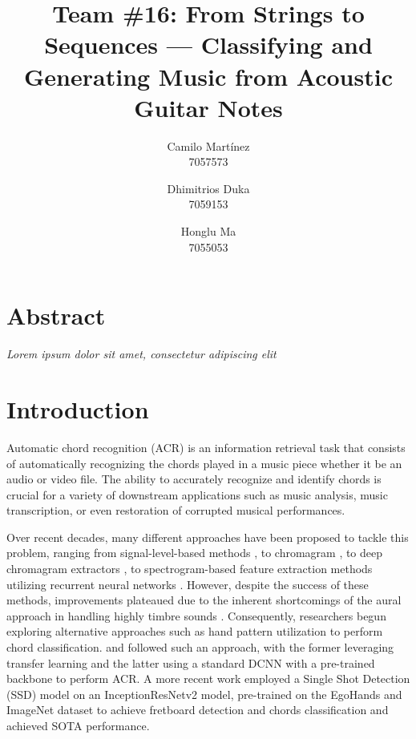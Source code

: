 \documentclass[10pt,twocolumn,letterpaper]{article}
\begin{document}
\newcommand{\dhimitrios}[1]{\textcolor{red}{Dhimitrios: #1}}

\title{Team \#16: From Strings to Sequences --- Classifying and Generating Music from Acoustic Guitar Notes}


\author{
  Camilo Martínez\\
  7057573\\
  \and
  Dhimitrios Duka\\
  7059153\\
  \and
  Honglu Ma\\
  7055053\\
}
\maketitle

\section{Abstract}
\emph{Lorem ipsum dolor sit amet, consectetur adipiscing elit}

\section{Introduction}
Automatic chord recognition (ACR) is an information retrieval task that consists of automatically recognizing the chords played in a music piece whether it be an audio or video file. The ability to accurately recognize and identify chords is crucial for a variety of downstream applications such as music analysis, music transcription, or even restoration of corrupted musical performances. 

Over recent decades, many different approaches have been proposed to tackle this problem, ranging from signal-level-based methods \cite{takuya1999realtime}, to chromagram \cite{stark2009real}, to deep chromagram extractors \cite{korzeniowski2016feature}, to spectrogram-based feature extraction methods utilizing recurrent neural networks \cite{boulanger2013audio}. However, despite the success of these methods, improvements plateaued due to the inherent shortcomings of the aural approach in handling highly timbre sounds \cite{du2023conditional}. Consequently, researchers begun exploring alternative approaches such as hand pattern utilization to perform chord classification. \cite{tran2019cnn} and \cite{ooaku2018guitar} followed such an approach, with the former leveraging transfer learning and the latter using a standard DCNN with a pre-trained backbone to perform ACR. A more recent work \cite{Kristian_Zaman_Tenoyo_Jodhinata_2024} employed a Single Shot Detection (SSD) model on an InceptionResNetv2 \cite{sandler2018mobilenetv2} model, pre-trained on the EgoHands \cite{Bambach_2015_ICCV} and ImageNet \cite{deng2009imagenet} dataset to achieve fretboard detection and chords classification and achieved SOTA performance.
\end{document}
